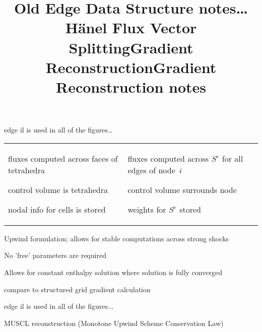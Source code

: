 \documentclass[landscape]{slides}
\begin{document}
\begin{note}
  \title{Old Edge Data Structure notes\ldots}
  \leftmargin 2in
  \begin{items}
    \item edge il is used in all of the figures\ldots\
  \end{items}
  \leftmargin 0in
  \begin{tabular}{p{.45\linewidth}p{.45\linewidth}}
    \begin{items}
      \item fluxes computed across faces of tetrahedra 
      \item control volume is tetrahedra 
      \item nodal info for cells is stored
    \end{items}&
    \begin{items}
      \item fluxes computed across $S^e$ for all edges of node~$i$
      \item control volume surrounds node
      \item weights for $S^e$ stored
    \end{items}
  \end{tabular}
\end{note}

\begin{slide}
  \title{H\"anel Flux Vector Splitting}
  \begin{items}
    \item Upwind formulation; allows for stable computations
          across strong shocks
    \item No 'free' parameters are required
    \item Allows for constant enthalpy solution where solution is
          fully converged 
  \end{items}
\end{slide}

\begin{slide}
  \title{Gradient Reconstruction}
\end{slide}

\begin{note}
  \title{Gradient Reconstruction notes}
  \begin{items}
    \item compare to structured grid gradient calculation\\ 
    \item edge il is used in all of the figures...\\
    \item MUSCL reconstruction
          (Monotone Upwind Scheme Conservation Law)
  \end{items}
\end{note}
\end{document}
